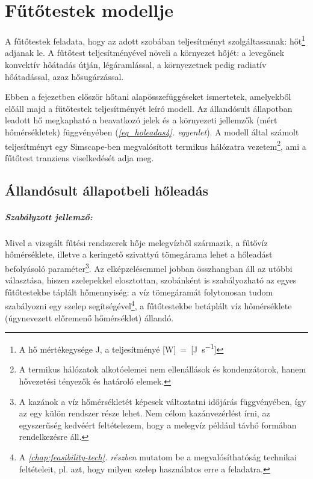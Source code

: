 \chapter{Fűtőtestek modellje}\label{chap:futotest}

A fűtőtestek feladata, hogy az adott szobában teljesítményt szolgáltassanak: hőt\footnote{A hő mértékegysége \si{\joule}, a teljesítményé [\si{\watt}]~=~[\si[per-mode=fraction]{\joule\per\second}]} adjanak le. A fűtőtest teljesítményével növeli a környezet hőjét:
a levegőnek konvektív hőátadás útján, légáramlással, a környezetnek pedig radiatív hőátadással, azaz hősugárzással.

Ebben a fejezetben először hőtani alapösszefüggéseket ismertetek, amelyekből előáll majd a fűtőtestek teljesítményét leíró modell. Az állandósult állapotban leadott hő megkapható a beavatkozó jelek és a környezeti jellemzők (mért hőmérsékletek) függvényében (\textit{\ref{eq_holeadas4}. egyenlet}).
A modell által számolt teljesítményt egy Simscape-ben megvalósított termikus hálózatra vezetem\footnote{A termikus hálózatok alkotóelemei nem ellenállások és kondenzátorok, hanem hővezetési tényezők és határoló elemek.}, ami a fűtőtest tranziens viselkedését adja meg.

\section{Állandósult állapotbeli hőleadás}\label{section:allandosult}

\paragraph{Szabályzott jellemző:} Mivel a vizsgált fűtési rendszerek hője melegvízből származik, a fűtővíz %
hőmérséklete, illetve a keringető szivattyú tömegárama lehet a hőleadást befolyásoló paraméter\footnote{A kazánok a víz hőmérsékletét képesek változtatni időjárás függvényében, így az egy külön rendszer része lehet. Nem célom kazánvezérlést írni, az egyszerűség kedvéért feltételezem, hogy a melegvíz például távhő formában rendelkezésre áll.}. Az elképzelésemmel jobban összhangban áll az utóbbi választása, hiszen szelepekkel elosztottan, szobánként is szabályozható az egyes fűtőtestekbe táplált hőmennyiség: a víz tömegáramát folytonosan tudom szabályozni egy szelep segítségével\footnote{A \textit{\ref{chap:feasibility-tech}. részben} mutatom be a megvalósíthatóság technikai feltételeit, pl. azt, hogy milyen szelep használatos erre a feladatra.}, a fűtőtestekbe betáplált víz hőmérséklete (úgynevezett előremenő hőmérséklet) állandó.

